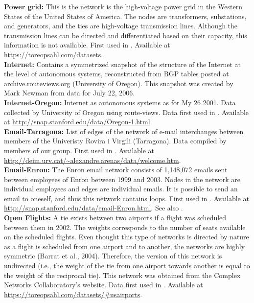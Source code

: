 \documentclass{article}
\begin{document}
\textbf{Power grid:} This is the network is the high-voltage power grid in the Western States of the United States of America. The nodes are transformers, substations, and generators, and the ties are high-voltage transmission lines. Although the transmission lines can be directed and differentiated based on their capacity, this information is not available. First used in \cite{Watts1998}. Available at \url{https://toreopsahl.com/datasets}.
\\

\textbf{Internet:} Contains a symmetrized snapshot of the structure
of the Internet at the level of autonomous systems, reconstructed from BGP
tables posted at archive.routeviews.org (University of Oregon).  This snapshot was created by Mark
Newman from data for July 22, 2006.
\\

\textbf{Internet-Oregon:} Internet as autonomous systems as for My 26 2001. Data collected by University of Oregon using route-views. Data first used in \cite{Leskovec2005GraphsExplanations}. Available at \url{http://snap.stanford.edu/data/Oregon-1.html} \\


\textbf{Email-Tarragona:} List of edges of the network of e-mail interchanges between members of the Univeristy Rovira i Virgili (Tarragona). Data compiled by members of our group. First used in \cite{Guimera2003Self-similarInteractions}. Available at \url{http://deim.urv.cat/~alexandre.arenas/data/welcome.htm}.
\\

\textbf{Email-Enron:} The Enron email network consists of 1,148,072 emails sent between employees of Enron between 1999 and 2003. Nodes in the network are individual employees and edges are individual emails. It is possible to send an email to oneself, and thus this network contains loops. First used in \cite{leskovec2009}. Available at \url{http://snap.stanford.edu/data/email-Enron.html}. See also \cite{konect:2017:enron,konect:klimt04}.
\\

\textbf{Open Flights:} A tie exists between two airports if a flight was scheduled between them in 2002. The weights corresponds to the number of seats available on the scheduled flights. Even thought this type of networks is directed by nature as a flight is scheduled from one airport and to another, the networks are highly symmetric (Barrat et al., 2004). Therefore, the version of this network is undirected (i.e., the weight of the tie from one airport towards another is equal to the weight of the reciprocal tie). This network was obtained from the Complex Networks Collaboratory’s website. Data first used in \cite{Colizza2007Reaction-diffusionNetworks}. Available at \url{https://toreopsahl.com/datasets/#usairports}.
\\
\end{document}
